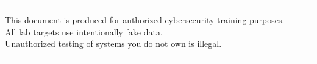 \begin{titlepage}
\begin{center}
\vfill

{\color{uzgray}\rule{0.6\textwidth}{0.4pt}}

\vspace{0.5cm}

{\small\color{uzgray}
This document is produced for authorized cybersecurity training purposes.\\
All lab targets use intentionally fake data.\\
Unauthorized testing of systems you do not own is illegal.%
}

\vspace{0.8cm}

{\color{uzblue}\rule{0.55\textwidth}{1.5pt}}

\end{center}

\end{titlepage}

\nopagecolor
\color{black}
